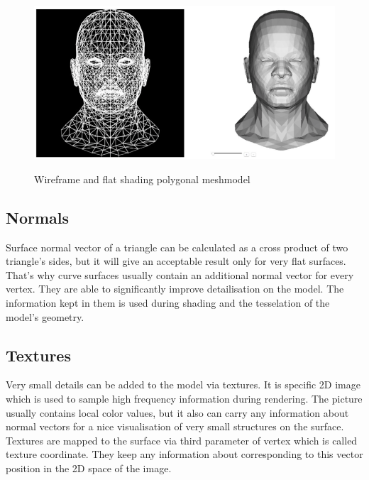 \documentclass[twoside, english, 11pt]{report}
\begin{document}
\begin{figure}[!h]
\includegraphics[scale=0.55]{img/mesh}\\
\caption{Wireframe and flat shading polygonal meshmodel}
\end{figure}

\subsection{Normals}
Surface normal vector of a triangle can be calculated as a cross product of two triangle's sides, but it will give an acceptable result only for very flat surfaces. That's why curve surfaces usually contain an additional normal vector for every vertex. They are able to significantly improve detailisation on the model. The information kept in them is used during shading and the tesselation of the model's geometry.\\


\subsection{Textures}
Very small details can be added to the model via textures. It is specific 2D image which is used to sample high frequency information during rendering. The picture usually contains local color values, but it also can carry any information about normal vectors for a nice visualisation of very small structures on the surface. Textures are mapped to the surface via third parameter of vertex which is called texture coordinate. They keep any information about corresponding to this vector position in the 2D space of the image.\\

\end{document}
